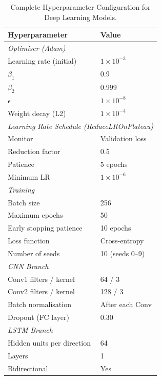 \documentclass[conference]{IEEEtran}
\begin{document}
\begin{table}[htbp]
\centering
\renewcommand{\arraystretch}{1.12}
\caption{Complete Hyperparameter Configuration for Deep Learning Models.}
\label{tab:hyper}
\begin{tabular}{lp{4.2cm}}
\toprule
\textbf{Hyperparameter} & \textbf{Value} \\
\midrule
\multicolumn{2}{l}{\textit{Optimiser (Adam)}} \\
Learning rate (initial)         & $1 \times 10^{-3}$ \\
$\beta_1$                       & 0.9 \\
$\beta_2$                       & 0.999 \\
$\epsilon$                      & $1 \times 10^{-8}$ \\
Weight decay (L2)               & $1 \times 10^{-4}$ \\
\midrule
\multicolumn{2}{l}{\textit{Learning Rate Schedule (ReduceLROnPlateau)}} \\
Monitor                         & Validation loss \\
Reduction factor                & 0.5 \\
Patience                        & 5 epochs \\
Minimum LR                      & $1 \times 10^{-6}$ \\
\midrule
\multicolumn{2}{l}{\textit{Training}} \\
Batch size                      & 256 \\
Maximum epochs                  & 50 \\
Early stopping patience         & 10 epochs \\
Loss function                   & Cross-entropy \\
Number of seeds                 & 10 (seeds 0--9) \\
\midrule
\multicolumn{2}{l}{\textit{CNN Branch}} \\
Conv1 filters / kernel          & 64 / 3 \\
Conv2 filters / kernel          & 128 / 3 \\
Batch normalisation             & After each Conv \\
Dropout (FC layer)              & 0.30 \\
\midrule
\multicolumn{2}{l}{\textit{LSTM Branch}} \\
Hidden units per direction      & 64 \\
Layers                          & 1 \\
Bidirectional                   & Yes \\

\end{tabular}
\end{table}
\end{document}
